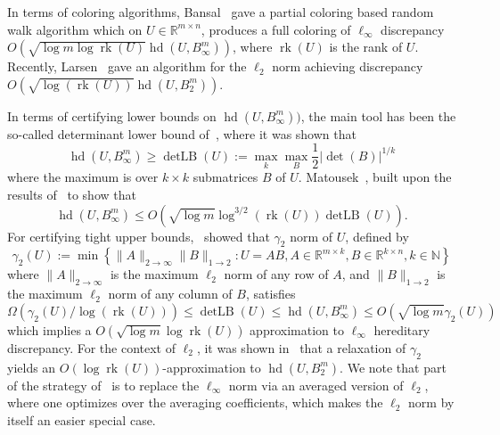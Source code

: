 \documentclass[11pt]{article}
\newcommand{\R}{{\mathbb{R}}}
\newcommand{\N}{{\mathbb{N}}}
\newcommand{\set}[1]{\left\{ #1 \right\}}
\DeclareMathOperator{\detlb}{detLB}
\DeclareMathOperator{\hd}{hd}
\DeclareMathOperator{\rank}{rk}
\begin{document}
In terms of coloring algorithms, Bansal~\cite{Bansal10} gave a partial coloring
based random walk algorithm which on $U \in \R^{m \times n}$, produces a full
coloring of $\ell_\infty$ discrepancy $O(\sqrt{\log m \log \rank(U)}
\hd(U,B_\infty^m))$, where $\rank(U)$ is the rank of $U$. Recently,
Larsen~\cite{Larsen17} gave an algorithm for the $\ell_2$ norm achieving
discrepancy $O(\sqrt{\log(\rank(U))}\hd(U,B_2^m))$. 

In terms of certifying lower bounds on $\hd(U,B_\infty^m))$, the main tool has
been the so-called determinant lower bound of~\cite{LSV}, where it was shown that
\[
\hd(U,B_\infty^m) \geq \detlb(U) := \max_k \max_B \frac{1}{2}|\det(B)|^{1/k}
\]       
where the maximum is over $k \times k$ submatrices $B$ of $U$.
Matousek~\cite{Matousek11}, built upon the results of~\cite{Bansal10} to show that 
\[
\hd(U,B_\infty^m) \leq O(\sqrt{\log m} \log^{3/2}(\rank(U)) \detlb(U)).
\]
For certifying tight upper bounds,~\cite{NT15,disc-gamma2} showed that
$\gamma_2$ norm of $U$, defined by 
\[
\gamma_2(U) := \min \set{\|A\|_{2 \rightarrow \infty} \|B\|_{1 \rightarrow 2}: U
= A B, A \in \R^{m \times k}, B \in \R^{k \times n}, k \in \N}  
\]
where $\|A\|_{2 \rightarrow \infty}$ is the maximum $\ell_2$ norm of any row of $A$,
and $\|B\|_{1 \rightarrow 2}$ is the maximum $\ell_2$ norm of any column of $B$,
satisfies
\begin{equation}
\Omega(\gamma_2(U)/\log(\rank(U))) \leq \detlb(U) \leq \hd(U,B_\infty^m) \leq O(\sqrt{\log m} \gamma_2(U)) 
\end{equation}
which implies a $O(\sqrt{\log m} \log \rank(U))$ approximation to $\ell_\infty$
hereditary discrepancy. For the context of $\ell_2$, it was shown in~\cite{NT15}
that a relaxation of $\gamma_2$ yields an $O(\log \rank(U))$-approximation to
$\hd(U,B_2^m)$. We note that part of the strategy of~\cite{NT15,disc-gamma2}
is to replace the $\ell_\infty$ norm via an averaged version of $\ell_2$, where
one optimizes over the averaging coefficients, which makes the $\ell_2$ norm by
itself an easier special case.
\end{document}
